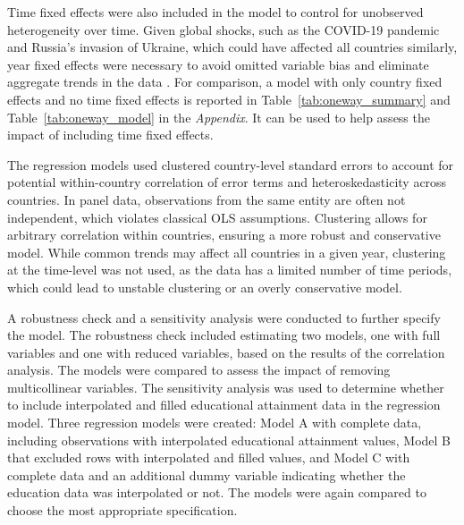 Time fixed effects were also included in the model to control for unobserved heterogeneity over time. 
Given global shocks, such as the COVID-19 pandemic and Russia's invasion of Ukraine, which could have affected all countries similarly, year fixed effects were necessary to avoid omitted variable bias and eliminate aggregate trends in the data \parencite{backstrom_are_2019}.
For comparison, a model with only country fixed effects and no time fixed effects is reported in Table~\ref{tab:oneway_summary} and Table~\ref{tab:oneway_model} in the \textit{Appendix}.
It can be used to help assess the impact of including time fixed effects.

The regression models used clustered country-level standard errors to account for potential within-country correlation of error terms and heteroskedasticity across countries. 
In panel data, observations from the same entity are often not independent, which violates classical OLS assumptions. 
Clustering allows for arbitrary correlation within countries, ensuring a more robust and conservative model. 
While common trends may affect all countries in a given year, clustering at the time-level was not used, as the data has a limited number of time periods, which could lead to unstable clustering 
or an overly conservative model.

A robustness check and a sensitivity analysis were conducted to further specify the model.
The robustness check included estimating two models, one with full variables and one with reduced variables, based on the results of the correlation analysis. 
The models were compared to assess the impact of removing multicollinear variables.
The sensitivity analysis was used to determine whether to include interpolated and filled educational attainment data in the regression model. 
Three regression models were created: Model A with complete data, including observations with interpolated educational attainment values, Model B that excluded rows with interpolated and filled values, and Model C with complete data and an additional dummy variable indicating whether the education data was interpolated or not. 
The models were again compared to choose the most appropriate specification.